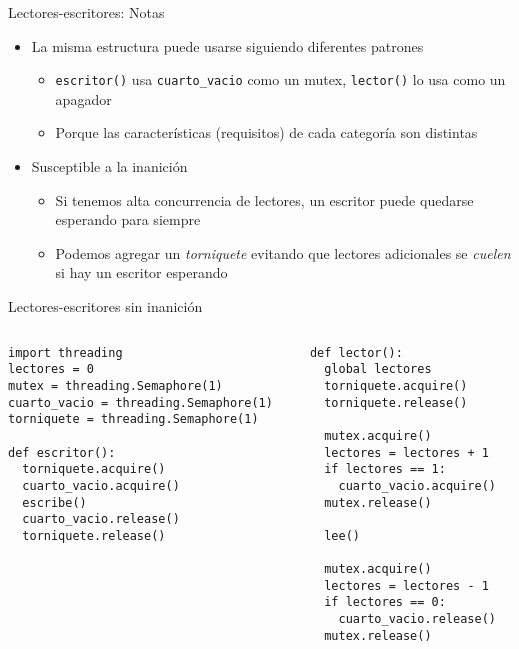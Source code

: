 \documentclass[presentation]{beamer}
\begin{document}
\begin{frame}[label={sec:org98fb732},fragile]{Lectores-escritores: Notas}
 \begin{itemize}
\item La misma estructura puede usarse siguiendo diferentes patrones
\begin{itemize}
\item \texttt{escritor()} usa \texttt{cuarto\_vacio} como un mutex, \texttt{lector()} lo usa
como un apagador
\item Porque las características (requisitos) de cada categoría son distintas
\end{itemize}
\item Susceptible a la inanición
\begin{itemize}
\item Si tenemos alta concurrencia de lectores, un escritor puede
quedarse esperando para siempre
\item Podemos agregar un \emph{torniquete} evitando que lectores adicionales
se \emph{cuelen} si hay un escritor esperando
\end{itemize}
\end{itemize}
\end{frame}

\begin{frame}[label={sec:org189944d},fragile]{Lectores-escritores sin inanición}
 \begin{columns}\begin{column}{0.5\textwidth}
\begin{verbatim}
import threading
lectores = 0
mutex = threading.Semaphore(1)
cuarto_vacio = threading.Semaphore(1)
torniquete = threading.Semaphore(1)

def escritor():
  torniquete.acquire()
  cuarto_vacio.acquire()
  escribe()
  cuarto_vacio.release()
  torniquete.release()
\end{verbatim}
\end{column} \begin{column}{0.5\textwidth}
\begin{verbatim}
def lector():
  global lectores
  torniquete.acquire()
  torniquete.release()

  mutex.acquire()
  lectores = lectores + 1
  if lectores == 1:
    cuarto_vacio.acquire()
  mutex.release()

  lee()

  mutex.acquire()
  lectores = lectores - 1
  if lectores == 0:
    cuarto_vacio.release()
  mutex.release()
\end{verbatim}
\end{column}\end{columns}
\end{frame}
\end{document}
